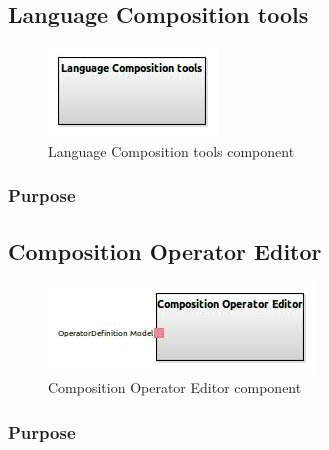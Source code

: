 \documentclass{gemoc} %
\begin{document}
\subsection{Language Composition tools}

\begin{figure}[htp]
	\begin{center}
	\includegraphics*[trim=0.0cm 0.0cm 0cm 0.0cm, clip=true, scale=1.0]{../images/generated/Generated_Language Composition tools.jpg}
	\caption{Language Composition tools component}
	\end{center}
\end{figure}

\subsubsection{Purpose}



\subsection{Composition Operator Editor}

\begin{figure}[htp]
	\begin{center}
	\includegraphics*[trim=0.0cm 0.0cm 0cm 0.0cm, clip=true, scale=1.0]{../images/generated/Generated_Composition Operator Editor.jpg}
	\caption{Composition Operator Editor component}
	\end{center}
\end{figure}

\subsubsection{Purpose}
\end{document}
